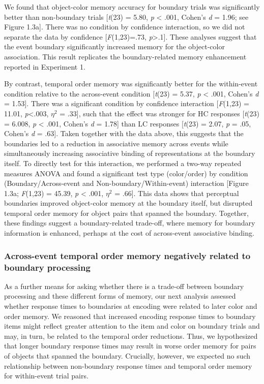We found that object-color memory accuracy for boundary trials was
significantly better than non-boundary trials {[}\emph{t}(23) = 5.80,
\emph{p} \textless{} .001, Cohen's \emph{d} = 1.96; see Figure 1.3a{]}.
There was no condition by confidence interaction, so we did not separate
the data by confidence {[}\emph{F}(1,23)=.73,
\emph{p}\textgreater{}.1{]}. These analyses suggest that the event
boundary significantly increased memory for the object-color
association. This result replicates the boundary-related memory
enhancement reported in Experiment 1.

By contrast, temporal order memory was significantly better for the
within-event condition relative to the across-event condition
{[}\emph{t}(23) = 5.37, \emph{p} \textless{} .001, Cohen's \emph{d} =
1.53{]}. There was a significant condition by confidence interaction
{[}\emph{F}(1,23) = 11.01, \emph{p}\textless{}.003, \(\eta^{2}\) =
.33{]}, such that the effect was stronger for HC responses
{[}\emph{t}(23) = 6.008, \emph{p} \textless{} .001, Cohen's \emph{d} =
1.78{]} than LC responses {[}\emph{t}(23) = 2.07, \emph{p} = .05,
Cohen's \emph{d} = .63{]}. Taken together with the data above, this
suggests that the boundaries led to a reduction in associative memory
across events while simultaneously increasing associative binding of
representations at the boundary itself. To directly test for this
interaction, we performed a two-way repeated measures ANOVA and found a
significant test type (color/order) by condition (Boundary/Across-event
and Non-boundary/Within-event) interaction {[}Figure 1.3a;
\emph{F}(1,23) = 45.39, \emph{p} \textless{} .001, \(\eta^{2}\) =
.66{]}. This data shows that perceptual boundaries improved object-color
memory at the boundary itself, but disrupted temporal order memory for
object pairs that spanned the boundary. Together, these findings suggest
a boundary-related trade-off, where memory for boundary information is
enhanced, perhaps at the cost of across-event associative binding.

\subsubsection{Across-event temporal order memory negatively related to
boundary
processing}\label{across-event-temporal-order-memory-negatively-related-to-boundary-processing}

As a further means for asking whether there is a trade-off between
boundary processing and these different forms of memory, our next
analysis assessed whether response times to boundaries at encoding were
related to later color and order memory. We reasoned that increased
encoding response times to boundary items might reflect greater
attention to the item and color on boundary trials and may, in turn, be
related to the temporal order reductions. Thus, we hypothesized that
longer boundary response times may result in worse order memory for
pairs of objects that spanned the boundary. Crucially, however, we
expected no such relationship between non-boundary response times and
temporal order memory for within-event trial pairs.

